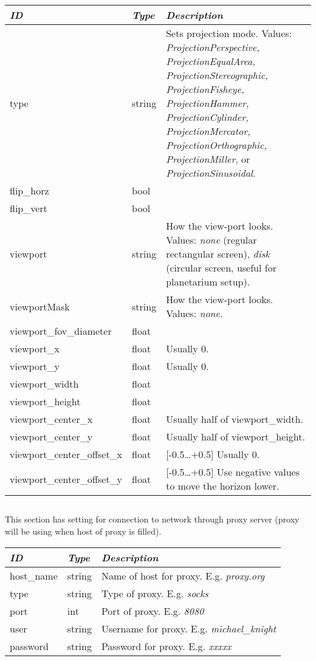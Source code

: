 \begin{longtabu} to \textwidth {l|l|X}\toprule
\emph{ID} & \emph{Type} & \emph{Description}\\\midrule
type & string & Sets projection mode. Values: \emph{ProjectionPerspective,
                ProjectionEqualArea, ProjectionStereographic, ProjectionFisheye,
                ProjectionHammer, ProjectionCylinder, ProjectionMercator,
                ProjectionOrthographic, ProjectionMiller}, or \emph{ProjectionSinusoidal}.\\\midrule
flip\_horz                   & bool & \\\midrule
flip\_vert                   & bool & \\\midrule
viewport & string & How the view-port looks. Values: \emph{none} (regular rectangular screen), 
                    \emph{disk} (circular screen, useful for planetarium setup).\\\midrule
viewportMask & string & How the view-port looks. Values: \emph{none}.\\\midrule %
viewport\_fov\_diameter & float & \\\midrule
viewport\_x & float & Usually 0. \\\midrule
viewport\_y & float & Usually 0. \\\midrule
viewport\_width & float & \\\midrule
viewport\_height & float & \\\midrule
viewport\_center\_x & float & Usually half of viewport\_width. \\\midrule
viewport\_center\_y & float & Usually half of viewport\_height. \\\midrule
viewport\_center\_offset\_x & float & [-0.5\ldots+0.5] Usually 0. \\\midrule
viewport\_center\_offset\_y & float & [-0.5\ldots+0.5] Use negative values to move the horizon lower. \\
\bottomrule
\end{longtabu}

\subsection{}\label{sec:config.ini:proxy}
This section has setting for connection to network through proxy server (proxy will be using when host of proxy is filled).

\begin{longtabu} to \textwidth {l|l|X}\toprule
\emph{ID}  & \emph{Type} & \emph{Description}\\\midrule
host\_name & string & Name of host for proxy. E.g. \emph{proxy.org}\\\midrule
type	   & string & Type of proxy. E.g. \emph{socks}\\\midrule
port       & int    & Port of proxy. E.g. \emph{8080}\\\midrule
user       & string & Username for proxy. E.g. \emph{michael\_knight}\\\midrule
password   & string & Password for proxy. E.g. \emph{xxxxx}\\\bottomrule
\end{longtabu}

